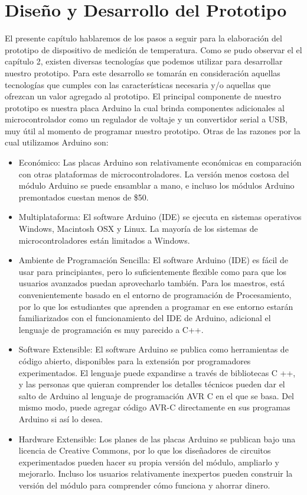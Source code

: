 \chapter{Diseño y Desarrollo del Prototipo}
\par 
El presente capítulo hablaremos de los pasos a seguir para la elaboración del prototipo de dispositivo de medición de temperatura. Como se pudo observar el el capítulo 2, existen diversas tecnologías que podemos utilizar para desarrollar nuestro prototipo. Para este desarrollo se tomarán en consideración aquellas tecnologías que cumples con las características necesaria y/o aquellas que ofrezcan un valor agregado al prototipo. El principal componente de nuestro prototipo es nuestra placa Arduino la cual brinda componentes adicionales al microcontrolador como un regulador de voltaje y un convertidor serial a USB, muy útil al momento de programar nuestro prototipo. Otras de las razones por la cual utilizamos Arduino son\cite{arduino-intro}:

\begin{itemize}
	\item Económico: 
	Las placas Arduino son relativamente económicas en comparación con otras plataformas de microcontroladores. La versión menos costosa del módulo Arduino se puede ensamblar a mano, e incluso los módulos Arduino premontados cuestan menos de \$50.
	
	\item Multiplataforma: El software Arduino (IDE) se ejecuta en sistemas operativos Windows, Macintosh OSX y Linux. La mayoría de los sistemas de microcontroladores están limitados a Windows.
	
	\item Ambiente de Programación Sencilla: El software Arduino (IDE) es fácil de usar para principiantes, pero lo suficientemente flexible como para que los usuarios avanzados puedan aprovecharlo también. Para los maestros, está convenientemente basado en el entorno de programación de Procesamiento, por lo que los estudiantes que aprenden a programar en ese entorno estarán familiarizados con el funcionamiento del IDE de Arduino, adicional el lenguaje de programación es muy parecido a C++.
	
	\item Software Extensible: El software Arduino se publica como herramientas de código abierto, disponibles para la extensión por programadores experimentados. El lenguaje puede expandirse a través de bibliotecas C ++, y las personas que quieran comprender los detalles técnicos pueden dar el salto de Arduino al lenguaje de programación AVR C en el que se basa. Del mismo modo, puede agregar código AVR-C directamente en sus programas Arduino si así lo desea.
	
	\item Hardware Extensible: 
	Los planes de las placas Arduino se publican bajo una licencia de Creative Commons, por lo que los diseñadores de circuitos experimentados pueden hacer su propia versión del módulo, ampliarlo y mejorarlo. Incluso los usuarios relativamente inexpertos pueden construir la versión del módulo para comprender cómo funciona y ahorrar dinero.
\end{itemize}

